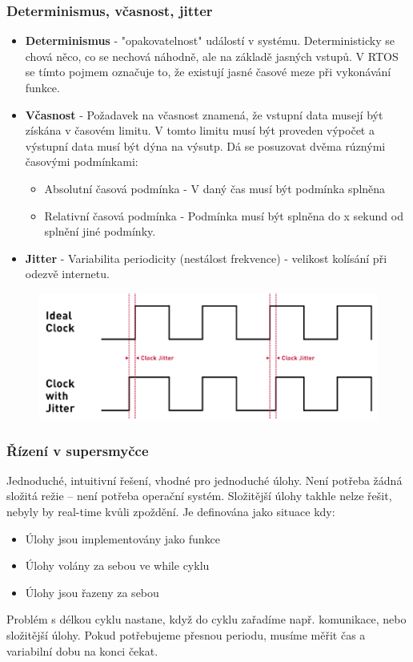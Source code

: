 \subsubsection*{Determinismus, včasnost, jitter}
\begin{itemize}
    \item \textbf{Determinismus} - "opakovatelnost" událostí v systému. Deterministicky se chová něco, co se nechová náhodně, ale na základě jasných vstupů. V RTOS se tímto pojmem označuje to, že existují jasné časové meze při vykonávání funkce.
    \item  \textbf{Včasnost} - Požadavek na včasnost znamená, že vstupní data musejí být získána v časovém limitu. V tomto limitu musí být proveden výpočet a výstupní data musí být dýna na výsutp. Dá se posuzovat dvěma rúznými časovými podmínkami: \begin{itemize}
              \item Absolutní časová podmínka - V daný čas musí být podmínka splněna
              \item Relativní časová podmínka - Podmínka musí být splněna do x sekund od splnění jiné podmínky.
          \end{itemize}
    \item \textbf{Jitter} - Variabilita periodicity (nestálost frekvence) - velikost kolísání při odezvě internetu.
\end{itemize}

\begin{figure}[h]
    \begin{center}
        \includegraphics[scale = 1]{img/Picture24.png}
    \end{center}
\end{figure}

\subsubsection*{Řízení v supersmyčce}
Jednoduché, intuitivní řešení, vhodné pro jednoduché úlohy. Není potřeba žádná složitá režie – není potřeba operační systém. Složitější úlohy takhle nelze řešit, nebyly by real-time kvůli zpoždění.
Je definována jako situace kdy:
\begin{itemize}
    \item Úlohy jsou implementovány jako funkce
    \item Úlohy volány za sebou ve while cyklu
    \item Úlohy jsou řazeny za sebou
\end{itemize}
Problém s délkou cyklu nastane, když do cyklu zařadíme např. komunikace, nebo složitější úlohy.
Pokud potřebujeme přesnou periodu, musíme měřit čas a variabilní dobu na konci čekat.

